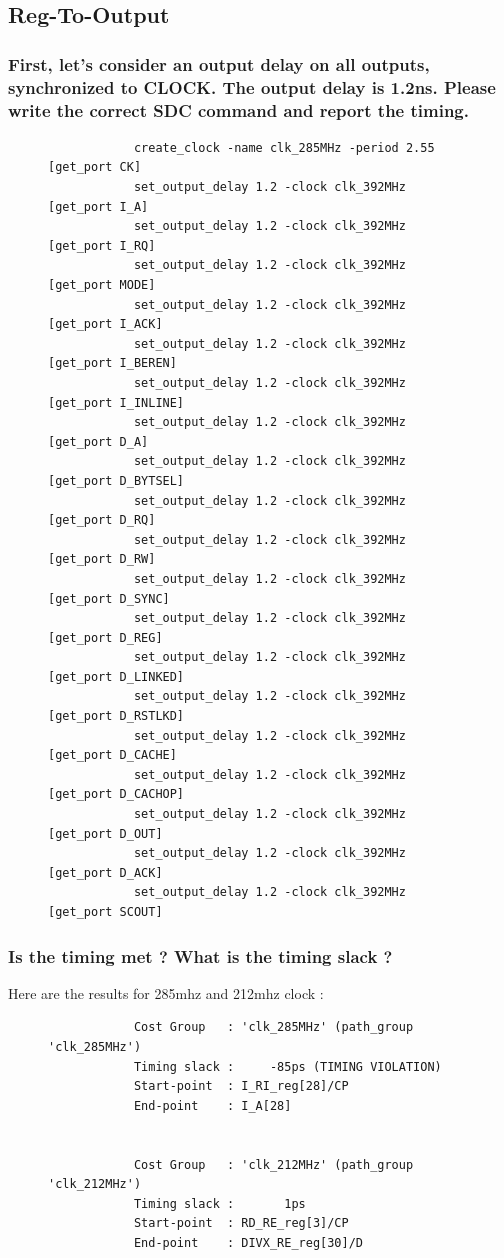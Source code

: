 \documentclass[11pt,a4paper,sans,dvipsnames]{report}
\begin{document}
	\newpage
	\subsection{Reg-To-Output}

	\subsubsection*{First, let's consider an output delay on all outputs, synchronized to CLOCK. The output delay is 1.2ns. Please write the correct SDC command and report the timing.}

	\begin{figure}[h!]
		\centering
		\begin{lstlisting}
			create_clock -name clk_285MHz -period 2.55 [get_port CK]
			set_output_delay 1.2 -clock clk_392MHz [get_port I_A]
			set_output_delay 1.2 -clock clk_392MHz [get_port I_RQ]
			set_output_delay 1.2 -clock clk_392MHz [get_port MODE]
			set_output_delay 1.2 -clock clk_392MHz [get_port I_ACK]
			set_output_delay 1.2 -clock clk_392MHz [get_port I_BEREN]
			set_output_delay 1.2 -clock clk_392MHz [get_port I_INLINE]
			set_output_delay 1.2 -clock clk_392MHz [get_port D_A]
			set_output_delay 1.2 -clock clk_392MHz [get_port D_BYTSEL]
			set_output_delay 1.2 -clock clk_392MHz [get_port D_RQ]
			set_output_delay 1.2 -clock clk_392MHz [get_port D_RW]
			set_output_delay 1.2 -clock clk_392MHz [get_port D_SYNC]
			set_output_delay 1.2 -clock clk_392MHz [get_port D_REG]
			set_output_delay 1.2 -clock clk_392MHz [get_port D_LINKED]
			set_output_delay 1.2 -clock clk_392MHz [get_port D_RSTLKD]
			set_output_delay 1.2 -clock clk_392MHz [get_port D_CACHE]
			set_output_delay 1.2 -clock clk_392MHz [get_port D_CACHOP]
			set_output_delay 1.2 -clock clk_392MHz [get_port D_OUT]
			set_output_delay 1.2 -clock clk_392MHz [get_port D_ACK]
			set_output_delay 1.2 -clock clk_392MHz [get_port SCOUT]
		\end{lstlisting}
		\label{fig:constraints_output}
	\end{figure}

	\subsubsection*{Is the timing met ? What is the timing slack ?}

	Here are the results for 285mhz and 212mhz clock :
	\begin{figure}[h!]
		\centering
		\begin{lstlisting}
			Cost Group   : 'clk_285MHz' (path_group 'clk_285MHz')
			Timing slack :     -85ps (TIMING VIOLATION)
			Start-point  : I_RI_reg[28]/CP
			End-point    : I_A[28]


			Cost Group   : 'clk_212MHz' (path_group 'clk_212MHz')
			Timing slack :       1ps 
			Start-point  : RD_RE_reg[3]/CP
			End-point    : DIVX_RE_reg[30]/D
		\end{lstlisting}
	\end{figure}
\end{document}
